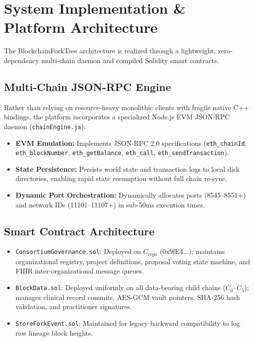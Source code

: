 \documentclass[journal]{IEEEtran}
\theoremstyle{definition}
\begin{document}
\section{System Implementation \& Platform Architecture}
The BlockchainForkTree architecture is realized through a lightweight, zero-dependency multi-chain daemon and compiled Solidity smart contracts.

\subsection{Multi-Chain JSON-RPC Engine}
Rather than relying on resource-heavy monolithic clients with fragile native C++ bindings, the platform incorporates a specialized Node.js EVM JSON-RPC daemon (\texttt{chainEngine.js}):
\begin{itemize}
    \item \textbf{EVM Emulation:} Implements JSON-RPC 2.0 specifications (\texttt{eth\_chainId}, \texttt{eth\_blockNumber}, \texttt{eth\_getBalance}, \texttt{eth\_call}, \texttt{eth\_sendTransaction}).
    \item \textbf{State Persistence:} Persists world state and transaction logs to local disk directories, enabling rapid state resumption without full chain re-sync.
    \item \textbf{Dynamic Port Orchestration:} Dynamically allocates ports (8545--8551+) and network IDs (11101--11107+) in sub-50ms execution times.
\end{itemize}

\subsection{Smart Contract Architecture}
\begin{itemize}
    \item \texttt{ConsortiumGovernance.sol}: Deployed on $C_{\text{repo}}$ (0x9fE4...); maintains organizational registry, project definitions, proposal voting state machine, and FHIR inter-organizational message queues.
    \item \texttt{BlockData.sol}: Deployed uniformly on all data-bearing child chains ($C_0$--$C_5$); manages clinical record commits, AES-GCM vault pointers, SHA-256 hash validation, and practitioner signatures.
    \item \texttt{StoreForkEvent.sol}: Maintained for legacy backward compatibility to log raw lineage block heights.
\end{itemize}
\end{document}
